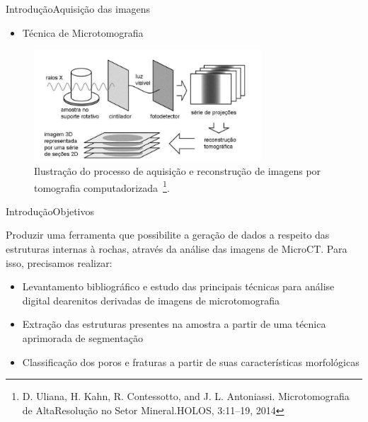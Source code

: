 \documentclass{beamer}
\begin{document}
\begin{frame}{Introdução}{Aquisição das imagens}
    \begin{itemize}
        \item Técnica de Microtomografia
    \end{itemize}
    
    \begin{figure}[!htb]
        \centering
        \includegraphics[width=8.5cm]{fig/metodoMRX.PNG}\\
        \scriptsize{Ilustração do processo de aquisição e reconstrução de imagens por tomografia computadorizada~\protect\footnote{D. Uliana, H. Kahn, R. Contessotto, and J. L. Antoniassi. Microtomografia de AltaResolução no Setor Mineral.HOLOS, 3:11–19, 2014}.}
        \label{fig:metodoMRX}
    \end{figure}
\end{frame}

\begin{frame}{Introdução}{Objetivos}

Produzir uma ferramenta que possibilite a geração de dados a respeito das estruturas internas à rochas, através da análise das imagens de MicroCT. Para isso, precisamos realizar:

    \begin{itemize}
        \item Levantamento bibliográfico e estudo das principais técnicas para análise digital dearenitos derivadas de imagens de microtomografia
        \item Extração das estruturas presentes na amostra a partir de uma técnica aprimorada de segmentação
        \item Classificação dos poros e fraturas a partir de suas características morfológicas
    \end{itemize}
    
\end{frame}
\end{document}
